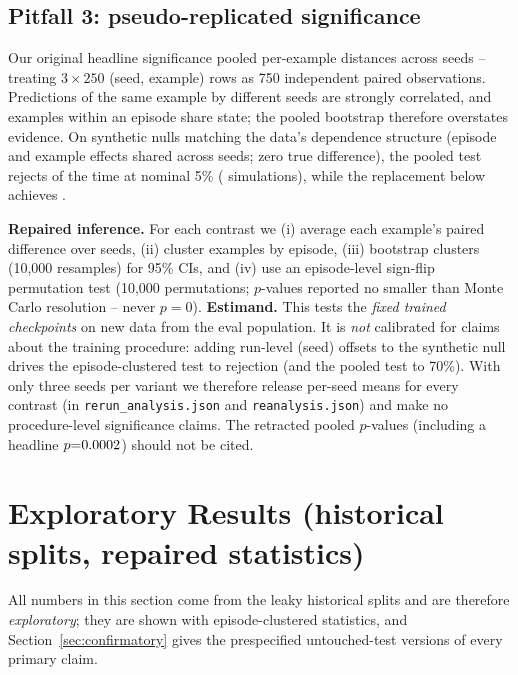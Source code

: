 \subsection{Pitfall 3: pseudo-replicated significance}
\label{sec:stats}

Our original headline significance pooled per-example distances across
seeds -- treating $3\times250$ (seed, example) rows as 750 independent
paired observations. Predictions of the same example by different seeds
are strongly correlated, and examples within an episode share state; the
pooled bootstrap therefore overstates evidence. On synthetic nulls
matching the data's dependence structure (episode and example effects
shared across seeds; zero true difference), the pooled test rejects
\TypeIPooled{} of the time at nominal 5\% (\TypeISims{} simulations),
while the replacement below achieves \TypeIClustered{}.

\textbf{Repaired inference.} For each contrast we (i) average each
example's paired difference over seeds, (ii) cluster examples by episode,
(iii) bootstrap clusters (10{,}000 resamples) for 95\% CIs, and (iv) use
an episode-level sign-flip permutation test (10{,}000 permutations;
$p$-values reported no smaller than Monte Carlo resolution -- never
$p{=}0$). \textbf{Estimand.} This tests the \emph{fixed trained
checkpoints} on new data from the eval population. It is \emph{not}
calibrated for claims about the training procedure: adding run-level
(seed) offsets to the synthetic null drives the episode-clustered test to
\TypeIProc{} rejection (and the pooled test to 70\%). With only three
seeds per variant we therefore
release per-seed means for every contrast (in
\texttt{rerun\_analysis.json} and \texttt{reanalysis.json}) and make no
procedure-level significance claims. The retracted pooled $p$-values (including a headline
$p{=}0.0002$) should not be cited.

\section{Exploratory Results (historical splits, repaired statistics)}
\label{sec:exploratory}

All numbers in this section come from the leaky historical splits and are
therefore \emph{exploratory}; they are shown with episode-clustered
statistics, and Section~\ref{sec:confirmatory} gives the prespecified
untouched-test versions of every primary claim.

